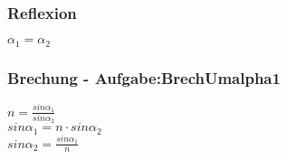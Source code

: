 \subsubsection{Reflexion} 
\begin{minipage}{0.45\textwidth} 
$ \alpha _{1}  = \alpha _{2} $\\ 
\end{minipage} 
\begin{minipage}{0.45\textwidth} 
 
\end{minipage} 
\subsubsection{Brechung - Aufgabe:BrechUmalpha1} 
\begin{minipage}{0.45\textwidth} 
$ n = \frac{sin\alpha _{1} }{sin\alpha _{2} } $\\ 
$ sin\alpha _{1}  = n\cdot sin\alpha _{2} $\\ 
$ sin\alpha _{2}  = \frac{sin\alpha _{1} }{ n} $\\ 
\end{minipage} 
\begin{minipage}{0.45\textwidth} 
 
\end{minipage} 
